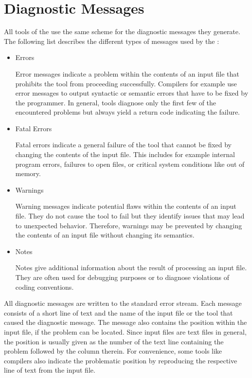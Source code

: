 \section{Diagnostic Messages}

All tools of the \ecs{} use the same scheme for the diagnostic messages they generate.
The following list describes the different types of messages used by the \ecs{}:

\begin{itemize}

\item Errors\nopagebreak

Error messages indicate a problem within the contents of an input file that prohibits the tool from proceeding successfully.
Compilers for example use error messages to output syntactic or semantic errors that have to be fixed by the programmer.
In general, tools diagnose only the first few of the encountered problems but always yield a return code indicating the failure.

\item Fatal Errors\nopagebreak

Fatal errors indicate a general failure of the tool that cannot be fixed by changing the contents of the input file.
This includes for example internal program errors, failures to open files, or critical system conditions like out of memory.

\item Warnings\nopagebreak

Warning messages indicate potential flaws within the contents of an input file.
They do not cause the tool to fail but they identify issues that may lead to unexpected behavior.
Therefore, warnings may be prevented by changing the contents of an input file without changing its semantics.

\item Notes\nopagebreak

Notes give additional information about the result of processing an input file.
They are often used for debugging purposes or to diagnose violations of coding conventions.

\end{itemize}

All diagnostic messages are written to the standard error stream.
Each message consists of a short line of text and the name of the input file or the tool that caused the diagnostic message.
The message also contains the position within the input file, if the problem can be located.
Since input files are text files in general, the position is usually given as the number of the text line containing the problem followed by the column therein.
For convenience, some tools like compilers also indicate the problematic position by reproducing the respective line of text from the input file.

